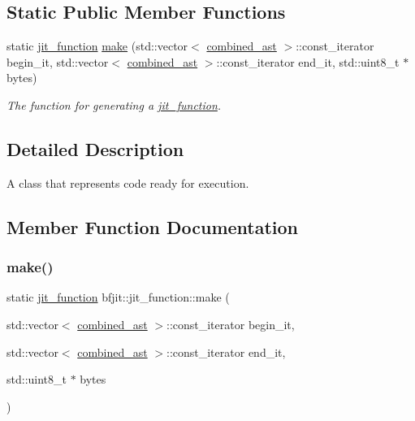 \subsection*{Static Public Member Functions}
\begin{DoxyCompactItemize}
\item 
static \hyperlink{classbfjit_1_1jit__function}{jit\+\_\+function} \hyperlink{classbfjit_1_1jit__function_a38edcf55a13c5766b8b832abcf19ac2b}{make} (std\+::vector$<$ \hyperlink{namespacebfjit_ad9bbdb76861e57928b1bc7695c2c0623}{combined\+\_\+ast} $>$\+::const\+\_\+iterator begin\+\_\+it, std\+::vector$<$ \hyperlink{namespacebfjit_ad9bbdb76861e57928b1bc7695c2c0623}{combined\+\_\+ast} $>$\+::const\+\_\+iterator end\+\_\+it, std\+::uint8\+\_\+t $\ast$bytes)
\begin{DoxyCompactList}\small\item\em {\itshape The} function for generating a \hyperlink{classbfjit_1_1jit__function}{jit\+\_\+function}. \end{DoxyCompactList}\end{DoxyCompactItemize}


\subsection{Detailed Description}
A class that represents code ready for execution. 

\subsection{Member Function Documentation}
\hypertarget{classbfjit_1_1jit__function_a38edcf55a13c5766b8b832abcf19ac2b}{}\label{classbfjit_1_1jit__function_a38edcf55a13c5766b8b832abcf19ac2b} 
\subsubsection{\texorpdfstring{make()}{make()}}
{\footnotesize\ttfamily static \hyperlink{classbfjit_1_1jit__function}{jit\+\_\+function} bfjit\+::jit\+\_\+function\+::make (\begin{DoxyParamCaption}\item[{std\+::vector$<$ \hyperlink{namespacebfjit_ad9bbdb76861e57928b1bc7695c2c0623}{combined\+\_\+ast} $>$\+::const\+\_\+iterator}]{begin\+\_\+it,  }\item[{std\+::vector$<$ \hyperlink{namespacebfjit_ad9bbdb76861e57928b1bc7695c2c0623}{combined\+\_\+ast} $>$\+::const\+\_\+iterator}]{end\+\_\+it,  }\item[{std\+::uint8\+\_\+t $\ast$}]{bytes }\end{DoxyParamCaption})\hspace{0.3cm}{\ttfamily [static]}}



